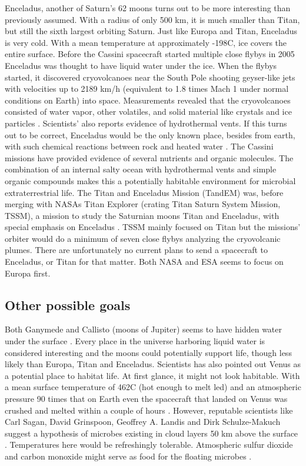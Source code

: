 \begin{multicols}{2}
Enceladus, another of Saturn’s 62 moons turns out to be more interesting than previously assumed.
With a radius of only 500 km, it is much smaller than Titan, but still the sixth largest orbiting Saturn.
Just like Europa and Titan, Enceladus is very cold.
With a mean temperature at approximately -198\degree C, ice covers the entire surface.
Before the Cassini spacecraft started multiple close flybys in 2005 Enceladus was thought to have liquid water under the ice.
When the flybys started, it discovered cryovolcanoes near the South Pole shooting geyser-like jets with velocities up to 2189 km/h (equivalent to 1.8 times Mach 1 under normal conditions on Earth) into space.
Measurements revealed that the cryovolcanoes consisted of water vapor, other volatiles, and solid material like crystals and ice particles \cite{Enceladus1}.
Scientists’ also reports evidence of hydrothermal vents.
If this turns out to be correct, Enceladus would be the only known place, besides from earth, with such chemical reactions between rock and heated water \cite{FPlan09}.
The Cassini missions have provided evidence of several nutrients and organic molecules.
The combination of an internal salty ocean with hydrothermal vents and simple organic compounds makes this a potentially habitable environment for microbial extraterrestrial life.
The Titan and Enceladus Mission (TandEM) was, before merging with NASAs Titan Explorer (crating Titan Saturn System Mission, TSSM), a mission to study the Saturnian moons Titan and Enceladus, with special emphasis on Enceladus \cite{FPlan11}.
TSSM mainly focused on Titan but the missions’ orbiter would do a minimum of seven close flybys analyzing the cryovolcanic plumes.
There are unfortunately no current plans to send a spacecraft to Enceladus, or Titan for that matter.
Both NASA and ESA seems to focus on Europa first.

\subsection*{Other possible goals}

Both Ganymede and Callisto (moons of Jupiter) seems to have hidden water under the surface \cite{FPlan09}.
Every place in the universe harboring liquid water is considered interesting and the moons could potentially support life, though less likely than Europa, Titan and Enceladus.
Scientists has also pointed out Venus as a potential place to habitat life.
At first glance, it might not look habitable.
With a mean surface temperature of 462\degree C (hot enough to melt led) and an atmospheric pressure 90 times that on Earth even the spacecraft that landed on Venus was crushed and melted within a couple of hours \cite{FPlan17} \cite{FPlan18}.
However, reputable scientists like Carl Sagan, David Grinspoon, Geoffrey A. Landis and Dirk Schulze-Makuch suggest a hypothesis of microbes existing in cloud layers 50 km above the surface \cite{LifeVenus}.
Temperatures here would be refreshingly tolerable.
Atmospheric sulfur dioxide and carbon monoxide might serve as food for the floating microbes \cite{FPlan20}.


\end{multicols}
